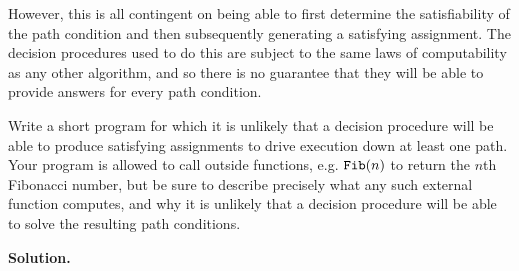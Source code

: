 \documentclass[10pt]{article}
\begin{document}
\begin{enumerate}
However, this is all contingent on being able to first determine the satisfiability of the path condition and then subsequently generating a satisfying assignment. The decision procedures used to do this are subject to the same laws of computability as any other algorithm, and so there is no guarantee that they will be able to provide answers for every path condition. 

Write a short program for which it is unlikely that a decision procedure will be able to produce satisfying assignments to drive execution down at least one path. Your program is allowed to call outside functions, e.g. $\texttt{\upshape Fib}(n)$ to return the $n$th Fibonacci number, but be sure to describe precisely what any such external function computes, and why it is unlikely that a decision procedure will be able to solve the resulting path conditions.

\textbf{Solution.}



\newpage

\end{enumerate}
\end{document}

